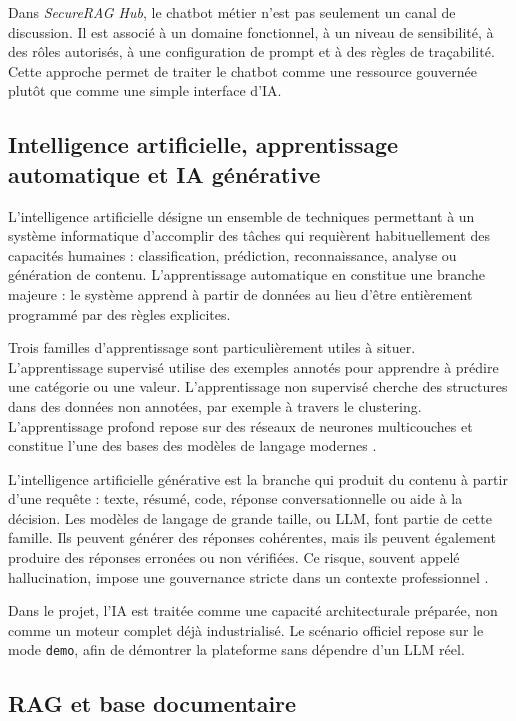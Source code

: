 Dans \textit{SecureRAG Hub}, le chatbot métier n'est pas seulement un canal de discussion. Il est associé à un domaine fonctionnel, à un niveau de sensibilité, à des rôles autorisés, à une configuration de prompt et à des règles de traçabilité. Cette approche permet de traiter le chatbot comme une ressource gouvernée plutôt que comme une simple interface d'IA.

\subsection{Intelligence artificielle, apprentissage automatique et IA générative}

L'intelligence artificielle désigne un ensemble de techniques permettant à un système informatique d'accomplir des tâches qui requièrent habituellement des capacités humaines : classification, prédiction, reconnaissance, analyse ou génération de contenu. L'apprentissage automatique en constitue une branche majeure : le système apprend à partir de données au lieu d'être entièrement programmé par des règles explicites.

Trois familles d'apprentissage sont particulièrement utiles à situer. L'apprentissage supervisé utilise des exemples annotés pour apprendre à prédire une catégorie ou une valeur. L'apprentissage non supervisé cherche des structures dans des données non annotées, par exemple à travers le clustering. L'apprentissage profond repose sur des réseaux de neurones multicouches et constitue l'une des bases des modèles de langage modernes \cite{russell_norvig_ai,goodfellow_deep_learning}.

L'intelligence artificielle générative est la branche qui produit du contenu à partir d'une requête : texte, résumé, code, réponse conversationnelle ou aide à la décision. Les modèles de langage de grande taille, ou LLM, font partie de cette famille. Ils peuvent générer des réponses cohérentes, mais ils peuvent également produire des réponses erronées ou non vérifiées. Ce risque, souvent appelé hallucination, impose une gouvernance stricte dans un contexte professionnel \cite{bommasani_foundation_models,ji_hallucination_survey}.

Dans le projet, l'IA est traitée comme une capacité architecturale préparée, non comme un moteur complet déjà industrialisé. Le scénario officiel repose sur le mode \texttt{demo}, afin de démontrer la plateforme sans dépendre d'un LLM réel.

\subsection{RAG et base documentaire}


